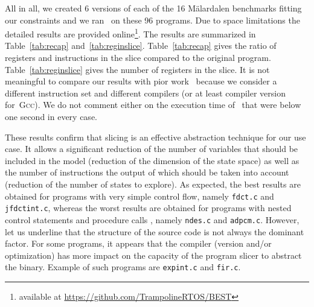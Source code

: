   All in all, we created 6 versions of each of the 16 Mälardalen benchmarks
  fitting our constraints and we ran \best\ on these 96 programs. Due to space
  limitations the detailed results are provided online\footnote{available at
    \url{https://github.com/TrampolineRTOS/BEST}}. The results are summarized in
  Table~\ref{tab:recap} and~\ref{tab:reginslice}. Table~\ref{tab:recap} gives
  the ratio of registers and instructions in the slice compared to the original
  program. Table~\ref{tab:reginslice} gives the number of registers in the
  slice. It is not meaningful to compare our results with pior work~\cite{CB13}
  because we consider a different instruction set and different compilers (or at
  least compiler version for~\textsc{Gcc}). We do not comment either on the
  execution time of \best\ that were below one second in every case.
  
  \begin{table}
      \centering
      \resizebox{\columnwidth}{!}{%
      }
      \caption{\centering Ratio of registers (resp. instructions) in slice compared to the unsliced program.%
      }
      \label{tab:recap}
  \end{table}

  \begin{table}
      \centering
      \caption{\centering Average number of registers in slice.%
      }
      \label{tab:reginslice}
  \end{table}

  
  These results confirm that slicing is an effective abstraction technique for
  our use case.  It allows a significant reduction of the number of variables
  that should be included in the model (reduction of the dimension of the state
  space) as well as the number of instructions the output of which should be
  taken into account (reduction of the number of states to explore).  As
  expected, the best results are obtained for programs with very simple control
  flow, namely \verb|fdct.c| and \verb|jfdctint.c|, whereas the worst results
  are obtained for programs with nested control statements and procedure calls ,
  namely \verb|ndes.c| and \verb|adpcm.c|. However, let us underline that the
  structure of the source code is not always the dominant factor.  For some
  programs, it appears that the compiler (version and/or optimization) has more
  impact on the capacity of the program slicer to abstract the binary. Example
  of such programs are \verb|expint.c| and \verb|fir.c|.

